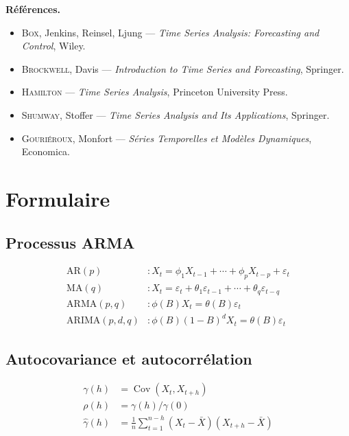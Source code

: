 \documentclass[12pt,a4paper,twoside]{book}
\theoremstyle{definition}
\theoremstyle{plain}
\theoremstyle{remark}
\newcommand{\Cov}{\operatorname{Cov}}
\newcommand{\eps}{\varepsilon}
\begin{document}
\medskip
\textbf{R\'ef\'erences.}
\begin{itemize}
\item \textsc{Box}, Jenkins, Reinsel, Ljung --- \emph{Time Series Analysis: Forecasting and Control}, Wiley.
\item \textsc{Brockwell}, Davis --- \emph{Introduction to Time Series and Forecasting}, Springer.
\item \textsc{Hamilton} --- \emph{Time Series Analysis}, Princeton University Press.
\item \textsc{Shumway}, Stoffer --- \emph{Time Series Analysis and Its Applications}, Springer.
\item \textsc{Gouri\'eroux}, Monfort --- \emph{S\'eries Temporelles et Mod\`eles Dynamiques}, Economica.
\end{itemize}

\mainmatter













\backmatter
\appendix
\chapter{Formulaire}
\label{app:formulaire}

\section{Processus ARMA}
\begin{align}
\text{AR}(p) &: X_t = \phi_1 X_{t-1}+\cdots+\phi_p X_{t-p}+\eps_t \\
\text{MA}(q) &: X_t = \eps_t+\theta_1\eps_{t-1}+\cdots+\theta_q\eps_{t-q} \\
\text{ARMA}(p,q) &: \phi(B)X_t = \theta(B)\eps_t \\
\text{ARIMA}(p,d,q) &: \phi(B)(1-B)^d X_t = \theta(B)\eps_t
\end{align}

\section{Autocovariance et autocorr\'elation}
\begin{align}
\gamma(h) &= \Cov(X_t,X_{t+h}) \\
\rho(h) &= \gamma(h)/\gamma(0) \\
\hat{\gamma}(h) &= \frac{1}{n}\sum_{t=1}^{n-h}(X_t-\bar{X})(X_{t+h}-\bar{X})
\end{align}
\end{document}
